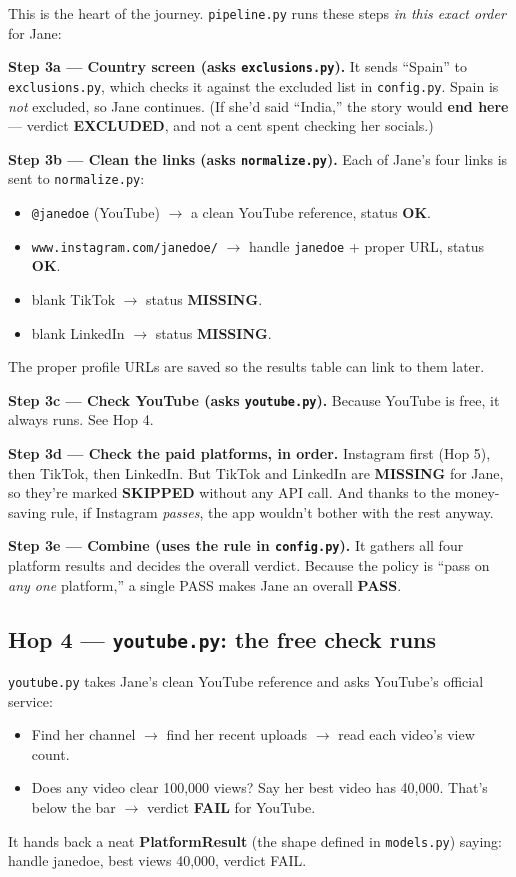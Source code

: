 \documentclass[11pt]{article}
\newcommand{\term}[1]{\textbf{\color{brandpurple}#1}}
\newcommand{\file}[1]{\texttt{\color{inkdark}#1}}
\begin{document}
This is the heart of the journey. \file{pipeline.py} runs these steps
\emph{in this exact order} for Jane:

\textbf{Step 3a — Country screen (asks \file{exclusions.py}).}
It sends ``Spain'' to \file{exclusions.py}, which checks it against the excluded
list in \file{config.py}. Spain is \emph{not} excluded, so Jane continues.
(If she'd said ``India,'' the story would \textbf{end here} — verdict
\term{EXCLUDED}, and not a cent spent checking her socials.)

\textbf{Step 3b — Clean the links (asks \file{normalize.py}).}
Each of Jane's four links is sent to \file{normalize.py}:
\begin{itemize}
  \item \texttt{@janedoe} (YouTube) $\rightarrow$ a clean YouTube reference,
  status \term{OK}.
  \item \texttt{www.instagram.com/janedoe/} $\rightarrow$ handle
  \texttt{janedoe} + proper URL, status \term{OK}.
  \item blank TikTok $\rightarrow$ status \term{MISSING}.
  \item blank LinkedIn $\rightarrow$ status \term{MISSING}.
\end{itemize}
The proper profile URLs are saved so the results table can link to them later.

\textbf{Step 3c — Check YouTube (asks \file{youtube.py}).}
Because YouTube is free, it always runs. See Hop 4.

\textbf{Step 3d — Check the paid platforms, in order.}
Instagram first (Hop 5), then TikTok, then LinkedIn. But TikTok and LinkedIn are
\term{MISSING} for Jane, so they're marked \term{SKIPPED} without any API call.
And thanks to the money-saving rule, if Instagram \emph{passes}, the app
wouldn't bother with the rest anyway.

\textbf{Step 3e — Combine (uses the rule in \file{config.py}).}
It gathers all four platform results and decides the overall verdict. Because
the policy is ``pass on \emph{any one} platform,'' a single PASS makes Jane an
overall \term{PASS}.

\subsection{Hop 4 — \file{youtube.py}: the free check runs}

\file{youtube.py} takes Jane's clean YouTube reference and asks YouTube's
official service:
\begin{itemize}
  \item Find her channel $\rightarrow$ find her recent uploads $\rightarrow$
  read each video's view count.
  \item Does any video clear 100,000 views? Say her best video has 40,000.
  That's below the bar $\rightarrow$ verdict \term{FAIL} for YouTube.
\end{itemize}
It hands back a neat \term{PlatformResult} (the shape defined in
\file{models.py}) saying: handle janedoe, best views 40,000, verdict FAIL.
\end{document}

